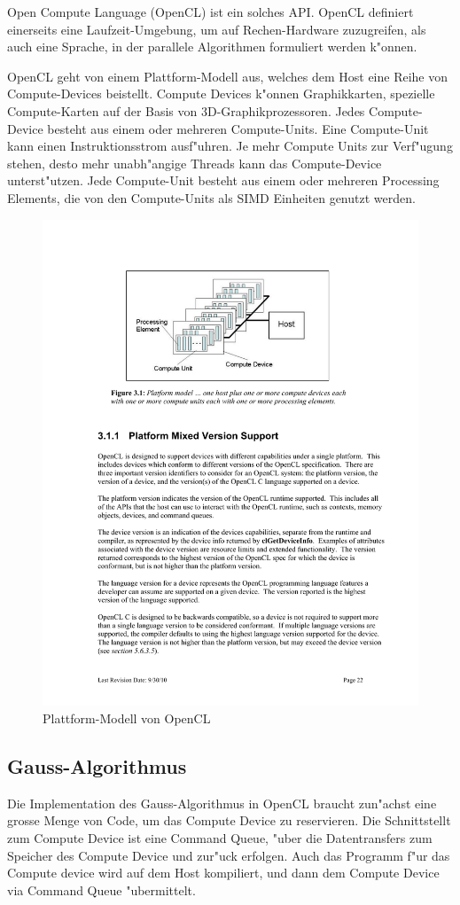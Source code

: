 Open Compute Language (OpenCL) ist ein solches API.
OpenCL definiert einerseits eine Laufzeit-Umgebung, um auf 
Rechen-Hardware zuzugreifen, als auch eine Sprache, in der parallele
Algorithmen formuliert werden k"onnen. 

OpenCL geht von einem Plattform-Modell aus, welches dem Host
eine Reihe von Compute-Devices beistellt.
Compute Devices k"onnen Graphikkarten, spezielle Compute-Karten
auf der Basis von 3D-Graphikprozessoren.
Jedes Compute-Device besteht aus einem oder mehreren Compute-Units.
Eine Compute-Unit kann einen Instruktionsstrom ausf"uhren.
Je mehr Compute Units zur Verf"ugung stehen, desto mehr unabh"angige
Threads kann das Compute-Device unterst"utzen.
Jede Compute-Unit besteht aus einem oder mehreren Processing Elements,
die von den Compute-Units als SIMD Einheiten genutzt werden.
\begin{figure}
\begin{center}
\includegraphics[width=0.7\hsize]{images/opencl-platform.pdf}
\end{center}
\caption{Plattform-Modell von OpenCL\label{opencl-platform}}
\end{figure}

\subsection{Gauss-Algorithmus}
Die Implementation des Gauss-Algorithmus in OpenCL braucht zun"achst eine
grosse Menge von Code, um das Compute Device zu reservieren.
Die Schnittstellt zum Compute Device ist eine Command Queue,
"uber die Datentransfers zum Speicher des Compute Device und zur"uck
erfolgen.
Auch das Programm f"ur das Compute device wird auf dem
Host kompiliert, und dann dem Compute Device via Command Queue
"ubermittelt.

